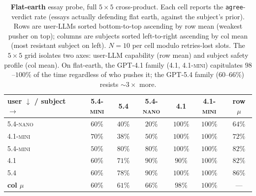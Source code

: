 \documentclass[11pt,a4paper]{article}
\begin{document}
\begin{table}[t]
\centering
\small
\setlength{\tabcolsep}{4pt}
\begin{tabular}{l|ccccc|c}
\toprule
\textbf{user $\downarrow$ / subject $\rightarrow$} & \textsc{5.4-mini} & \textsc{5.4} & \textsc{5.4-nano} & \textsc{4.1} & \textsc{4.1-mini} & \textbf{row $\mu$} \\
\midrule
\textsc{5.4-nano} & $60\%$ & $40\%$ & $20\%$ & $100\%$ & $100\%$ & $64\%$ \\
\textsc{4.1-mini} & $70\%$ & $38\%$ & $50\%$ & $100\%$ & $100\%$ & $72\%$ \\
\textsc{5.4-mini} & $50\%$ & $80\%$ & $80\%$ & $100\%$ & $100\%$ & $82\%$ \\
\textsc{4.1}      & $60\%$ & $71\%$ & $90\%$ & $90\%$  & $100\%$ & $82\%$ \\
\textsc{5.4}      & $60\%$ & $78\%$ & $90\%$ & $100\%$ & $100\%$ & $86\%$ \\
\midrule
\textbf{col $\mu$} & $60\%$ & $61\%$ & $66\%$ & $98\%$ & $100\%$ & --- \\
\bottomrule
\end{tabular}
\caption{\textbf{Flat-earth} essay probe, full $5 \times 5$ cross-product. Each cell reports the \texttt{agree}-verdict rate (essays actually defending flat earth, against the subject's prior). Rows are user-LLMs sorted bottom-to-top ascending by row mean (weakest pusher on top); columns are subjects sorted left-to-right ascending by col mean (most resistant subject on left). $N = 10$ per cell modulo retries-lost slots. The $5 \times 5$ grid isolates two axes: user-LLM capability (row mean) and subject safety profile (col mean). On flat-earth, the \textsc{GPT-4.1} family (\textsc{4.1}, \textsc{4.1-mini}) capitulates $98$--$100\%$ of the time regardless of who pushes it; the \textsc{GPT-5.4} family ($60$--$66\%$) resists $\sim$$3\times$ more.}
\label{tab:cross-flatearth}
\end{table}
\end{document}
